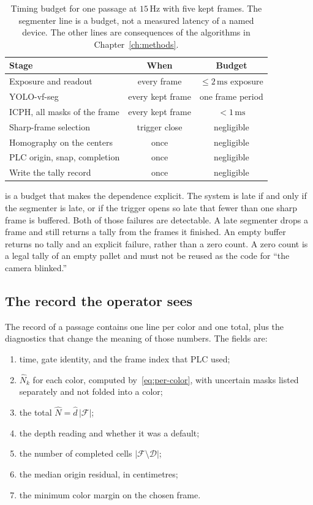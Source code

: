 \begin{table}[t]
\centering
\caption{Timing budget for one passage at $15\,\mathrm{Hz}$ with five kept frames. The segmenter line is a budget, not a measured latency of a named device. The other lines are consequences of the algorithms in Chapter~\ref{ch:methods}.}
\label{tab:timing}
\small
\begin{tabular}{@{}lcc@{}}
\toprule
Stage & When & Budget \\
\midrule
Exposure and readout & every frame & $\le 2\,\mathrm{ms}$ exposure \\
YOLO-vf-seg & every kept frame & one frame period \\
ICPH, all masks of the frame & every kept frame & $<1\,\mathrm{ms}$ \\
Sharp-frame selection & trigger close & negligible \\
Homography on the centers & once & negligible \\
PLC origin, snap, completion & once & negligible \\
Write the tally record & once & negligible \\
\bottomrule
\end{tabular}
\end{table}

 is a budget that makes the dependence explicit. The system is late if and only if the segmenter is late, or if the trigger opens so late that fewer than one sharp frame is buffered. Both of those failures are detectable. A late segmenter drops a frame and still returns a tally from the frames it finished. An empty buffer returns no tally and an explicit failure, rather than a zero count. A zero count is a legal tally of an empty pallet and must not be reused as the code for ``the camera blinked.''

\subsection{The record the operator sees}
\label{sec:sys-output}

The record of a passage contains one line per color and one total, plus the diagnostics that change the meaning of those numbers. The fields are:

\begin{enumerate}
\item time, gate identity, and the frame index that PLC used;
\item $\hat{N}_{k}$ for each color, computed by~\eqref{eq:per-color}, with uncertain masks listed separately and not folded into a color;
\item the total $\hat{N}=\hat{d}\,\lvert\mathcal{F}\rvert$;
\item the depth reading and whether it was a default;
\item the number of completed cells $\lvert\mathcal{F}\setminus\mathcal{D}\rvert$;
\item the median origin residual, in centimetres;
\item the minimum color margin on the chosen frame.
\end{enumerate}

